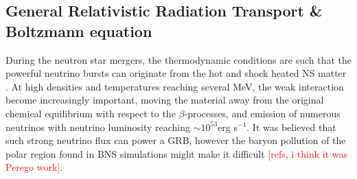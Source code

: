 \documentclass[11pt,a4paper,headinclude=true,DIV=14,BCOR=8mm,chapterprefix,listof=totoc,twoside,openright,abstracton]{scrbook}
\newcommand{\red}[1]{\textcolor{red}{#1}}
\begin{document}
%
%
%


\subsection{General Relativistic Radiation Transport \& Boltzmann equation}



During the neutron star mergers, the thermodynamic conditions are such that the powerful 
neutrino bursts can originate from the hot and shock heated NS matter \cite{Sekiguchi:2011zd}.
At high densities and temperatures reaching several MeV, the weak interaction become increasingly important, moving the material away from the original chemical equilibrium with respect to the 
$\beta$-processes, and emission of numerous neutrinos with neutrino luminosity reaching $\sim10^{53}$erg s$^{-1}$. 
It was believed that such strong neutrino flux can power a GRB, however the baryon pollution of the polar region found in BNS simulations might make it difficult \red{[refs, i think it was Perego work]}.
\end{document}
